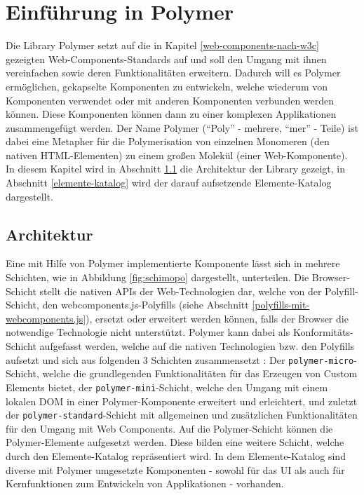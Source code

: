 \chapter{Einführung in Polymer}\label{einfuehrung-in-polymer}

Die Library Polymer setzt auf die in Kapitel \ref{web-components-nach-w3c} gezeigten Web-Components-Standards auf und soll den Umgang mit ihnen vereinfachen sowie deren Funktionalitäten erweitern. Dadurch will es Polymer ermöglichen, gekapselte Komponenten zu entwickeln, welche wiederum von Komponenten verwendet oder mit anderen Komponenten verbunden werden können. Diese Komponenten können dann zu einer komplexen Applikationen zusammengefügt werden. Der Name Polymer (``Poly'' - mehrere, ``mer'' - Teile) ist dabei eine Metapher für die Polymerisation von einzelnen Monomeren (den nativen \ac{HTML}-Elementen) zu einem großen Molekül (einer Web-Komponente). In diesem Kapitel wird in Abschnitt \ref{architektur} die Architektur der Library gezeigt, in Abschnitt \ref{elemente-katalog} wird der darauf aufsetzende Elemente-Katalog dargestellt.


\section{Architektur}\label{architektur}

Eine mit Hilfe von Polymer implementierte Komponente lässt sich in mehrere Schichten, wie in Abbildung \ref{fig:schimopo} dargestellt, unterteilen. Die Browser-Schicht stellt die nativen \ac{API}s der Web-Technologien dar, welche von der Polyfill-Schicht, den webcomponents.js-Polyfills (siehe Abschnitt \ref{polyfills-mit-webcomponents.js}), ersetzt oder erweitert werden können, falls der Browser die notwendige Technologie nicht unterstützt. Polymer kann dabei als Konformitäts-Schicht aufgefasst werden, welche auf die nativen Technologien bzw. den Polyfills aufsetzt und sich aus folgenden 3 Schichten zusammensetzt \cite{citeulike:13915080}: Der \texttt{polymer-micro}-Schicht, welche die grundlegenden Funktionalitäten für das Erzeugen von Custom Elements bietet, der \texttt{polymer-mini}-Schicht, welche den Umgang mit einem lokalen \ac{DOM} in einer Polymer-Komponente erweitert und erleichtert, und zuletzt der \texttt{polymer-standard}-Schicht mit allgemeinen und zusätzlichen Funktionalitäten für den Umgang mit Web Components. Auf die Polymer-Schicht können die Polymer-Elemente aufgesetzt werden. Diese bilden eine weitere Schicht, welche durch den Elemente-Katalog \cite{citeulike:13916374} repräsentiert wird. In dem Elemente-Katalog sind diverse mit Polymer umgesetzte Komponenten - sowohl für das \ac{UI} als auch für Kernfunktionen zum Entwickeln von Applikationen - vorhanden.

